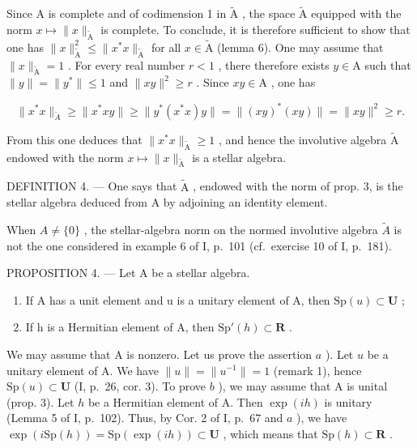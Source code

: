 Since A is complete and of codimension 1 in \(\widetilde{\mathrm{A}}\) , the space \(\widetilde{\mathrm{A}}\) equipped with the norm \(x \mapsto \|x\|_{\widetilde{\mathrm{A}}}\) is complete. To conclude, it is therefore sufficient to show that one has \(\|x\|_{\widetilde{\mathrm{A}}}^{2} \leqslant \|x^{*}x\|_{\widetilde{\mathrm{A}}}\) for all \(x \in \widetilde{\mathrm{A}}\) (lemma 6). One may assume that \(\|x\|_{\widetilde{\mathrm{A}}} = 1\) . For every real number \(r < 1\) , there therefore exists \(y \in \mathrm{A}\) such that \(\|y\| = \|y^{*}\| \leqslant 1\) and \(\|xy\|^2 \geqslant r\) . Since \(xy \in \mathrm{A}\) , one has

\[
\| x ^ {*} x \| _ {\widetilde {A}} \geqslant \| x ^ {*} x y \| \geqslant \| y ^ {*} (x ^ {*} x) y \| = \| (x y) ^ {*} (x y) \| = \| x y \| ^ {2} \geqslant r.
\]

From this one deduces that \(\| x^{*}x\|_{\widetilde{\mathrm{A}}}\geqslant 1\) , and hence the involutive algebra \(\widetilde{\mathrm{A}}\) endowed with the norm \(x\mapsto \| x\|_{\widetilde{\mathrm{A}}}\) is a stellar algebra.

DEFINITION 4. --- One says that \(\widetilde{\mathrm{A}}\) , endowed with the norm of prop. 3, is the stellar algebra deduced from A by adjoining an identity element.

When \(A \neq \{0\}\) , the stellar-algebra norm on the normed involutive algebra \(\widetilde{A}\) is not the one considered in example 6 of I, p.~101 (cf.~exercise 10 of I, p.~181).

PROPOSITION 4. --- Let A be a stellar algebra.

\begin{enumerate}
\def\labelenumi{\alph{enumi})}
\item
  If A has a unit element and u is a unitary element of A, then \(\mathrm{Sp}(u) \subset \mathbf{U}\) ;
\item
  If h is a Hermitian element of A, then \(\mathrm{Sp}'(h) \subset \mathbf{R}\) .
\end{enumerate}

We may assume that A is nonzero. Let us prove the assertion \(a\) ). Let \(u\) be a unitary element of A. We have \(\|u\|=\|u^{-1}\|=1\) (remark 1), hence \(\mathrm{Sp}(u)\subset\mathbf{U}\) (I, p.~26, cor. 3). To prove \(b\) ), we may assume that A is unital (prop. 3). Let \(h\) be a Hermitian element of A. Then \(\exp(ih)\) is unitary (Lemma 5 of I, p.~102). Thus, by Cor. 2 of I, p.~67 and \(a\) ), we have \(\exp(i\mathrm{Sp}(h))=\mathrm{Sp}(\exp(ih))\subset\mathbf{U}\) , which means that \(\mathrm{Sp}(h)\subset\mathbf{R}\) .

